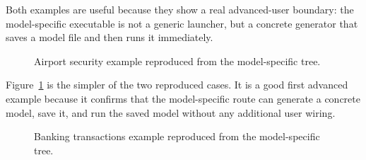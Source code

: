 Both examples are useful because they show a real advanced-user boundary: the
model-specific executable is not a generic launcher, but a concrete generator
that saves a model file and then runs it immediately.

\begin{figure}[htbp]
\centering
\caption{Airport security example reproduced from the model-specific tree.}
\label{fig:model-specific-airport-security-example}
\end{figure}

Figure~\ref{fig:model-specific-airport-security-example} is the simpler of the
two reproduced cases. It is a good first advanced example because it confirms
that the model-specific route can generate a concrete model, save it, and run
the saved model without any additional user wiring.

\begin{figure}[htbp]
\centering
\caption{Banking transactions example reproduced from the model-specific tree.}
\label{fig:model-specific-banking-transactions-example}
\end{figure}

